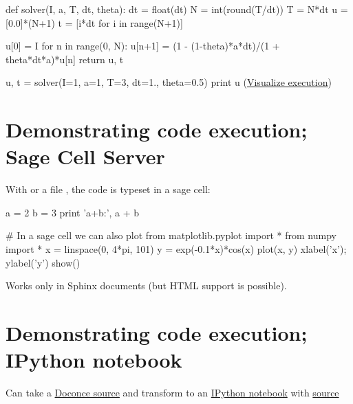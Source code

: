 \documentclass[%
twoside,                 %
draft,                   %
final,                   %
chapterprefix=true,      %
open=right               %
10pt]{book}
\newenvironment{graybox1admon}[1][]{
\begin{graybox1mdframed}[frametitle=#1]
}
{
\end{graybox1mdframed}
}
\begin{document}
\begin{shadedquoteBlue}
\bpypro
def solver(I, a, T, dt, theta):
    dt = float(dt)
    N = int(round(T/dt))
    T = N*dt
    u = [0.0]*(N+1)
    t = [i*dt for i in range(N+1)]

    u[0] = I
    for n in range(0, N):
        u[n+1] = (1 - (1-theta)*a*dt)/(1 + theta*dt*a)*u[n]
    return u, t

u, t = solver(I=1, a=1, T=3, dt=1., theta=0.5)
print u
\epypro
\noindent
(\href{{http://pythontutor.com/visualize.html\#code=def+solver\%28I\%2C+a\%2C+T\%2C+dt\%2C+theta\%29\%3A\%0A++++dt+\%3D+float\%28dt\%29\%0A++++N+\%3D+int\%28round\%28T\%2Fdt\%29\%29\%0A++++T+\%3D+N\%2Adt\%0A++++u+\%3D+\%5B0.0\%5D\%2A\%28N\%2B1\%29\%0A++++t+\%3D+\%5Bi\%2Adt+for+i+in+range\%28N\%2B1\%29\%5D\%0A\%0A++++u\%5B0\%5D+\%3D+I\%0A++++for+n+in+range\%280\%2C+N\%29\%3A\%0A++++++++u\%5Bn\%2B1\%5D+\%3D+\%281+-+\%281-theta\%29\%2Aa\%2Adt\%29\%2F\%281+\%2B+theta\%2Adt\%2Aa\%29\%2Au\%5Bn\%5D\%0A++++return+u\%2C+t\%0A\%0Au\%2C+t+\%3D+solver\%28I\%3D1\%2C+a\%3D1\%2C+T\%3D3\%2C+dt\%3D1.\%2C+theta\%3D0.5\%29\%0Aprint+u&mode=display&cumulative=false&heapPrimitives=false&drawParentPointers=false&textReferences=false&py=2&curInstr=0}}{Visualize execution}) 


\section*{Demonstrating code execution; Sage Cell Server}
\label{slide:sage:cell}

With  or a file , the code is typeset in
a sage cell:

\bpypro
a = 2
b = 3
print 'a+b:', a + b

# In a sage cell we can also plot
from matplotlib.pyplot import *
from numpy import *
x = linspace(0, 4*pi, 101)
y = exp(-0.1*x)*cos(x)
plot(x, y)
xlabel('x'); ylabel('y')
show()
\epypro


\begin{graybox1admon}[Warning.]
Works only in Sphinx documents (but HTML support is possible).
\end{graybox1admon}



\section*{Demonstrating code execution; IPython notebook}
\label{slide:ipynb}

Can take a \href{{http://hplgit.github.com/teamods/writing_reports/_static/report.do.txt.html}}{Doconce source} and transform to an \href{{http://nbviewer.ipython.org/url/hplgit.github.com/teamods/writing_reports/_static/report.ipynb}}{IPython notebook} with \href{{http://hplgit.github.com/teamods/writing_reports/_static/report.ipynb.html}}{source}


\end{shadedquoteBlue}
\end{document}
